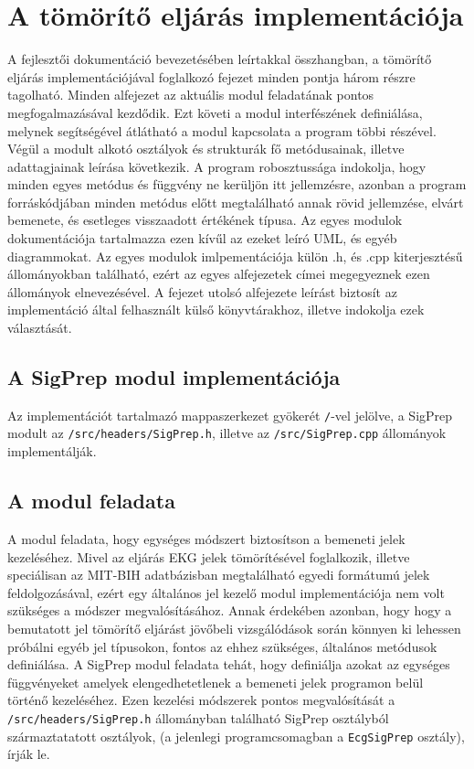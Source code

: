 \documentclass[oneside,titlepage,12pt,a4paper]{report}
\begin{document}
\section{A tömörítő eljárás implementációja}

A fejlesztői dokumentáció bevezetésében leírtakkal összhangban, a tömörítő eljárás implementációjával foglalkozó fejezet minden pontja három részre tagolható. Minden alfejezet az aktuális modul feladatának pontos megfogalmazásával kezdődik. Ezt követi a modul interfészének definiálása, melynek segítségével átlátható a modul kapcsolata a program többi részével. Végül a modult alkotó osztályok és strukturák fő metódusainak, illetve adattagjainak leírása következik. A program robosztussága indokolja, hogy minden egyes metódus és függvény ne kerüljön itt jellemzésre, azonban a program forráskódjában minden metódus előtt megtalálható annak rövid jellemzése, elvárt bemenete, és esetleges visszaadott értékének típusa. Az egyes modulok dokumentációja tartalmazza ezen kívűl az ezeket leíró UML, és egyéb diagrammokat. Az egyes modulok imlpementációja külön .h, és .cpp kiterjesztésű állományokban található, ezért az egyes alfejezetek címei megegyeznek ezen állományok elnevezésével. A fejezet utolsó alfejezete leírást biztosít az implementáció által felhasznált külső könyvtárakhoz, illetve indokolja ezek választását.

\subsection{A SigPrep modul implementációja}

Az implementációt tartalmazó mappaszerkezet gyökerét \texttt{/}-vel jelölve, a SigPrep modult  az \texttt{/src/headers/SigPrep.h}, illetve az \texttt{/src/SigPrep.cpp} állományok implementálják. 

\subsection*{A modul feladata}

\par A modul feladata, hogy egységes módszert biztosítson a bemeneti jelek kezeléséhez. 
Mivel az eljárás EKG jelek tömörítésével foglalkozik, illetve speciálisan az MIT-BIH adatbázisban megtalálható egyedi formátumú jelek feldolgozásával, 
ezért egy általános jel kezelő modul implementációja nem volt szükséges a módszer megvalósításához. Annak érdekében azonban, hogy 
hogy a bemutatott jel tömörítő eljárást jövőbeli vizsgálódások során könnyen ki lehessen próbálni egyéb jel típusokon, fontos az ehhez szükséges, általános metódusok definiálása. A SigPrep modul feladata tehát, hogy definiálja azokat az egységes függvényeket amelyek elengedhetetlenek a bemeneti jelek programon belül történő kezeléséhez. Ezen kezelési módszerek pontos megvalósítását a \texttt{/src/headers/SigPrep.h} állományban található SigPrep osztályból származtatatott osztályok, (a jelenlegi programcsomagban a \texttt{EcgSigPrep} osztály), írják le. 
\end{document}
